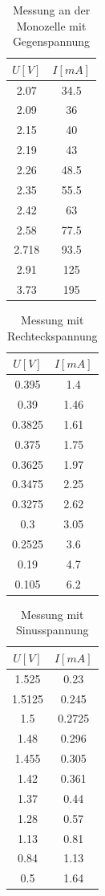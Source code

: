 \documentclass[11pt,ngerman,a4paper]{article}
\begin{document}
 
 \begin{table}[h]
 \centering
 \begin{tabular}{|c|c|}
  \hline
  $U[V]$ & $I[mA]$  \\
  \hline
  2.07 & 34.5 \\
  2.09 & 36 \\
  2.15 & 40 \\
  2.19 & 43 \\
  2.26 & 48.5\\
  2.35 & 55.5\\
  2.42 & 63 \\
  2.58 & 77.5\\
  2.718 & 93.5\\
  2.91 & 125\\
  3.73 & 195\\
  \hline
 \end{tabular}
  \caption{Messung an der Monozelle mit Gegenspannung}
 \label{Messung 2}
 \end{table}
 
 
 \begin{table}[h]
 \centering

 \begin{tabular}{|c|c|}
  \hline
  $U[V]$ & $I[mA]$  \\
  \hline
  0.395 & 1.4 \\
  0.39 & 1.46 \\
  0.3825& 1.61 \\
  0.375 & 1.75 \\
  0.3625 & 1.97\\
  0.3475 & 2.25\\
  0.3275 & 2.62 \\
  0.3 & 3.05\\
  0.2525 & 3.6\\
  0.19 & 4.7\\
  0.105 & 6.2\\
  \hline
 \end{tabular}
  \caption{Messung mit Rechteckspannung}
 \label{Messung 3}
 \end{table}
 
 
 \begin{table}[h]
 \centering

 \begin{tabular}{|c|c|}
  \hline
  $U[V]$ & $I[mA]$  \\
  \hline
  1.525 & 0.23 \\
  1.5125 & 0.245 \\
  1.5& 0.2725 \\
  1.48 & 0.296 \\
  1.455 & 0.305\\
  1.42& 0.361\\
  1.37 & 0.44 \\
  1.28 & 0.57\\
  1.13 & 0.81\\
  0.84 & 1.13\\
  0.5 & 1.64\\
  \hline
 \end{tabular}
  \caption{Messung mit Sinusspannung}
 \label{Messung 4}
 \end{table}
 
\end{document}
